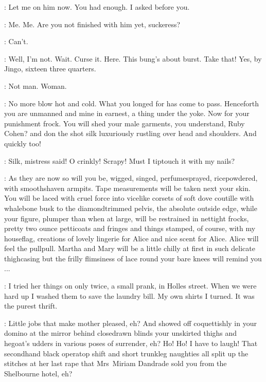 \Florry:
Let me on him now.
You had enough.
I asked before you.

\Zoe:
Me. Me.
Are you not finished with him yet, suckeress?

\Bloom:
Can't.

\Bello:
Well, I'm not.
Wait.
Curse it.
Here.
This bung's about burst.
Take that!
Yes, by Jingo, sixteen three quarters.%

\Bloom:
Not man.
Woman.

\Bello:
No more blow hot and cold.
What you longed for has come to pass.
Henceforth you are unmanned and mine in earnest, a thing under the yoke.
Now for your punishment frock.
You will shed your male garments, you understand, Ruby Cohen?
and don the shot silk luxuriously rustling over head and shoulders.
And quickly too!

\Bloom:
Silk, mistress said!
O crinkly!
Scrapy!
Must I tiptouch it with my nails?

\Bello:
As they are now so will you be, wigged,
singed, perfumesprayed, ricepowdered, with smoothshaven armpits.
Tape measurements will be taken next your skin.
You will be laced with cruel force into vicelike corsets
of soft dove coutille with whalebone busk to the diamondtrimmed pelvis,
the absolute outside edge, while your figure,
plumper than when at large, will be restrained in nettight frocks,
pretty two ounce petticoats and fringes and things stamped,
of course, with my houseflag,
creations of lovely lingerie for Alice and nice scent for Alice.
Alice will feel the pullpull.
Martha and Mary will be a little chilly at first
in such delicate thighcasing but the frilly flimsiness of lace
round your bare knees will remind you ...

\Bloom:
I tried her things on only twice, a small prank, in Holles street.
When we were hard up I washed them to save the laundry bill.
My own shirts I turned.
It was the purest thrift.

\Bello:
Little jobs that make mother pleased, eh?
And showed off coquettishly in your domino at the mirror
behind closedrawn blinds your unskirted thighs and hegoat's udders
in various poses of surrender, eh?
Ho! Ho!
I have to laugh!
That secondhand black operatop shift and short trunkleg naughties
all split up the stitches at her last rape
that Mrs~Miriam Dandrade sold you from the Shelbourne hotel, eh?

